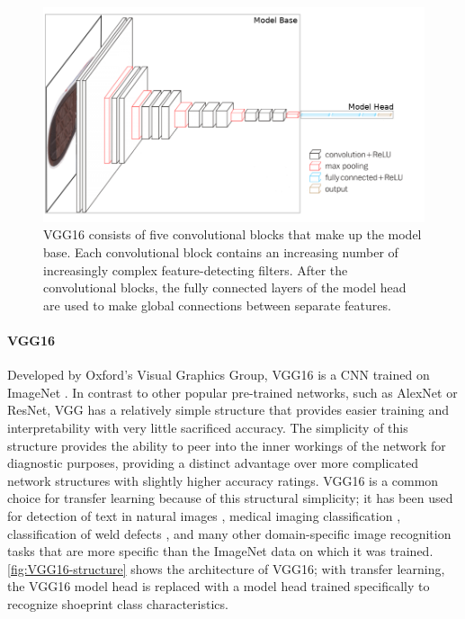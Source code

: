 \documentclass{article}\usepackage[]{graphicx}\usepackage[table]{xcolor}
\begin{document}
\begin{figure}
\centering
\includegraphics[width=\textwidth]{images/vgg16-shoe-nolabel}
\caption[VGG16 structure]{VGG16 consists of five convolutional blocks that make up the model base. Each convolutional block contains an increasing number of increasingly complex feature-detecting filters. After the convolutional blocks, the fully connected layers of the model head are used to make global connections between separate features.}\label{fig:VGG16-structure}
\end{figure}

\paragraph{VGG16}
Developed by Oxford's Visual Graphics Group, VGG16 is a CNN trained on ImageNet
\citep{krizhevskyImageNetClassificationDeep2012}. In contrast to other popular pre-trained networks, such as AlexNet or ResNet, VGG has a relatively simple structure that provides easier training and interpretability with very little sacrificed accuracy. The simplicity of this structure provides the ability to peer into the inner workings of the network for diagnostic purposes, providing a distinct advantage over more complicated network structures with slightly higher accuracy ratings. VGG16 is a common choice for transfer learning because of this structural simplicity; it has been used for detection of text in natural images \citep{zhongDeepTextUnifiedFramework2016}, medical imaging classification \citep{oquabLearningTransferringMidlevel2014}, classification of weld defects \citep{liuWeldDefectImages2018}, and many other domain-specific image recognition tasks that are more specific than the ImageNet data on which it was trained. \autoref{fig:VGG16-structure} shows the architecture of VGG16; with transfer learning, the VGG16 model head is replaced with a model head trained specifically to recognize shoeprint class characteristics.
\end{document}

